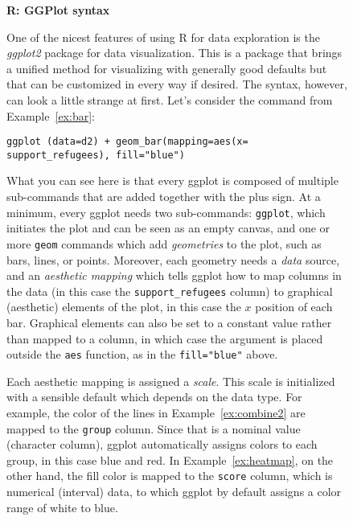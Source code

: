 %

\begin{figure}
  \vspace{-1em}
\begin{feature}
\textbf{R: GGPlot syntax}

One of the nicest features of using R for data exploration is the \emph{ggplot2} package for data visualization. This is a package that brings a unified method for visualizing with generally good defaults but that can be customized in every way if desired. The syntax, however, can look a little strange at first.
Let's consider the command from Example~\ref{ex:bar}:
\begin{verbatim}
ggplot (data=d2) + geom_bar(mapping=aes(x= support_refugees), fill="blue")
\end{verbatim}
What you can see here is that every ggplot is composed of multiple sub-commands that are added together with the plus sign.
At a minimum, every ggplot needs two sub-commands: \texttt{ggplot},
which initiates the plot and can be seen as an empty canvas,
and one or more \texttt{geom} commands which add \emph{geometries} to the plot,
such as bars, lines, or points.
Moreover, each geometry needs a \emph{data} source, and an \emph{aesthetic mapping}
which tells ggplot how to map columns in the data (in this case the \verb|support_refugees| column) to graphical (aesthetic) elements of the plot,
in this case the $x$ position of each bar.
Graphical elements can also be set to a constant value rather than mapped to a column,
in which case the argument is placed outside the \texttt{aes} function, as in the \verb|fill="blue"| above.

Each aesthetic mapping is assigned a \emph{scale}.
This scale is initialized with a sensible default which depends on the data type.
For example, the color of the lines in Example~\ref{ex:combine2} are mapped to the \verb|group| column.
Since that is a nominal value (character column), ggplot automatically assigns colors to each group,
in this case blue and red.
In Example~\ref{ex:heatmap}, on the other hand, the fill color is mapped to the \verb|score| column, which is numerical (interval) data, to which ggplot by default assigns a color range of white to blue.


\end{feature}
\end{figure}

